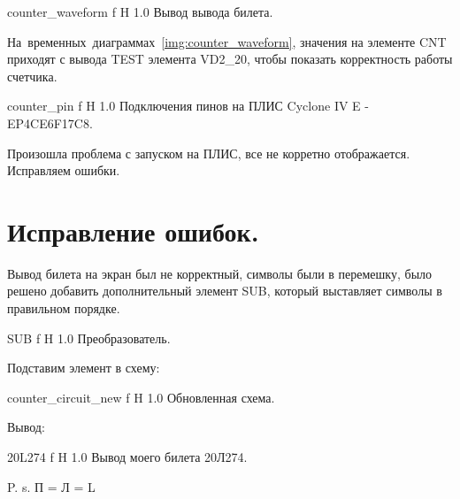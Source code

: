 \documentclass{bmstu}
\begin{document}
	{counter_waveform}
	{f} %
	{H} %
	{1.0\textwidth} %
	{Вывод вывода билета.} %

	\begin{flushleft}
		На~временных~диаграммах~\ref{img:counter_waveform}, значения на элементе 
		CNT приходят с вывода TEST элемента VD2\_20, чтобы показать корректность 
		работы счетчика.
	\end{flushleft}

	{counter_pin}
	{f} %
	{H} %
	{1.0\textwidth} %
	{Подключения пинов на ПЛИС Cyclone IV E - EP4CE6F17C8.} %
	\begin{flushleft}
		Произошла проблема с запуском на ПЛИС, все не корретно отображается. 
		Исправляем ошибки.
	\end{flushleft}
	
	\section{Исправление ошибок.}
	
	\begin{flushleft}
		Вывод билета на экран был не корректный, символы были в перемешку, было 
		решено добавить дополнительный элемент SUB, который выставляет символы в 
		правильном порядке.
	\end{flushleft}
	
	{SUB}
	{f} %
	{H} %
	{1.0\textwidth} %
	{Преобразователь.} %
	
	\begin{flushleft}
		Подставим элемент в схему:
	\end{flushleft}

	{counter_circuit_new}
	{f} %
	{H} %
	{1.0\textwidth} %
	{Обновленная схема.} %
	
	\begin{flushleft}
		Вывод:
	\end{flushleft}

	{20L274}
	{f} %
	{H} %
	{1.0\textwidth} %
	{Вывод моего билета 20Л274.} %
	
	\begin{flushleft}
		P. s. П = Л = L
	\end{flushleft}
\end{document}
